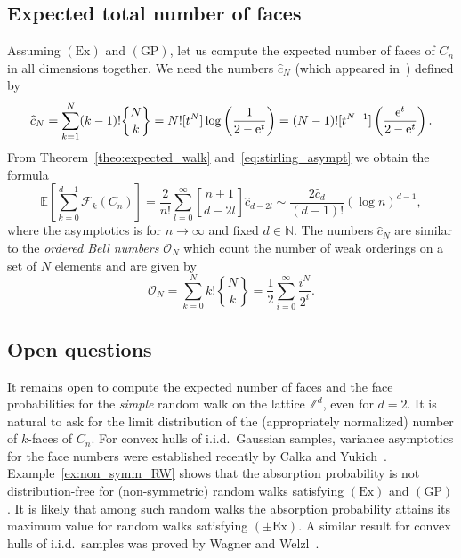 \documentclass[12pt, reqno]{amsart}
\theoremstyle{plain}
\theoremstyle{definition}
\theoremstyle{remark}
\begin{document}
\subsection{Expected total number of faces}
Assuming  $(\text{Ex})$ and $(\text{GP})$, let us compute the expected number of faces of $C_n$ in all dimensions together.
We need the numbers $\widehat  c_N$ (which appeared in~\cite{sprugnoli}) defined by
\begin{equation}\label{eq:def_hat_c_N}
\widehat  c_N = \sum_{k=1}^N (k-1)!  {\genfrac{\{}{\}}{0pt}{}{{N}}{{k}}} = N! [t^N] \log \left(\frac 1 {2-{{\rm e}}^t}\right) = (N-1)! [t^{N-1}] \left(\frac{{{\rm e}}^t}{2-{{\rm e}}^t}\right).
\end{equation}
From Theorem~\ref{theo:expected_walk} and~\eqref{eq:stirling_asympt} we obtain the formula
$$
{\mathbb E} \left[\sum_{k=0}^{d-1} \mathcal F_{k}(C_n)\right]
=
\frac 2 {n!}\sum_{l=0}^\infty  {\genfrac{[}{]}{0pt}{}{{n+1}}{{d-2l}}} \widehat  c_{d-2l}
\sim  \frac{2 \widehat  c_{d}}{(d-1)!} (\log n)^{d-1},
$$
where the asymptotics is for $n\to\infty$ and fixed $d\in{\mathbb{N}}$.
The numbers $\widehat  c_N$ are similar to the \textit{ordered Bell numbers} $\mathcal O_N$ which count the number of weak orderings on a set of $N$ elements and are given by
$$
\mathcal O_N = \sum_{k=0}^N k! {\genfrac{\{}{\}}{0pt}{}{{N}}{{k}}} = \frac 12 \sum_{i=0}^\infty \frac{i^N}{2^i}.
$$

\subsection{Open questions}
It remains open to compute the expected number of faces and the face probabilities for the \emph{simple} random walk on the lattice ${\mathbb{Z}}^d$, even for $d=2$.
It is natural to ask for the limit distribution of the (appropriately normalized) number of $k$-faces of $C_n$. For convex hulls of i.i.d.\ Gaussian samples, variance asymptotics for the face numbers were established recently by Calka and Yukich~\cite{calka_yukich}. Example~\ref{ex:non_symm_RW} shows that the absorption probability is not distribution-free for (non-symmetric) random walks satisfying $(\text{Ex})$ and $(\text{GP})$. It is likely that among such random walks the absorption probability attains its maximum value for random walks satisfying $(\pm\text{Ex})$.  A similar result for convex hulls of i.i.d.\ samples was proved by Wagner and Welzl~\cite{wagner_welzl}.



\end{document}

